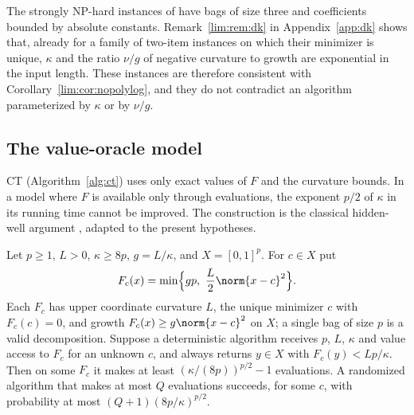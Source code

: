 The strongly NP-hard instances of \cite[Theorem~3]{DelPiaKhajavirad2026}
have bags of size three and coefficients bounded by absolute constants.
Remark~\ref{lim:rem:dk} in Appendix~\ref{app:dk} shows that, already for a
family of two-item instances on which their minimizer is unique, $\kappa$ and the ratio $\nu/g$ of
negative curvature to growth are exponential in the input length. These
instances are therefore consistent with Corollary~\ref{lim:cor:nopolylog},
and they do not contradict an algorithm parameterized by $\kappa$ or by
$\nu/g$.

\subsection{The value-oracle model}\label{sec:limits-oracle}

CT (Algorithm~\ref{alg:ct}) uses only exact values of $F$ and the curvature
bounds. In a model where $F$ is available only through evaluations, the
exponent $p/2$ of $\kappa$ in its running time cannot be improved. The
construction is the classical hidden-well argument
\cite{NemirovskiYudin1983}, adapted to the present hypotheses.

\begin{proposition}\label{lim:prop:oracle}
Let $p\ge1$, $L>0$, $\kappa\ge8p$, $g=L/\kappa$, and $X=[0,1]^p$. For
$c\in X$ put
\[
F_c(x)=\min\Bigl\{gp,\ \frac L2\norm{x-c}^2\Bigr\}.
\]
Each $F_c$ has upper coordinate curvature $L$, the unique minimizer $c$
with $F_c(c)=0$, and growth $F_c(x)\ge g\norm{x-c}^2$ on $X$; a single
bag of size $p$ is a valid decomposition. Suppose a deterministic algorithm
receives $p$, $L$, $\kappa$ and value access to $F_c$ for an unknown $c$,
and always returns $y\in X$ with $F_c(y)<Lp/\kappa$. Then on some $F_c$ it
makes at least $(\kappa/(8p))^{p/2}-1$ evaluations. A randomized algorithm
that makes at most $Q$ evaluations succeeds, for some $c$, with probability
at most $(Q+1)(8p/\kappa)^{p/2}$.
\end{proposition}

